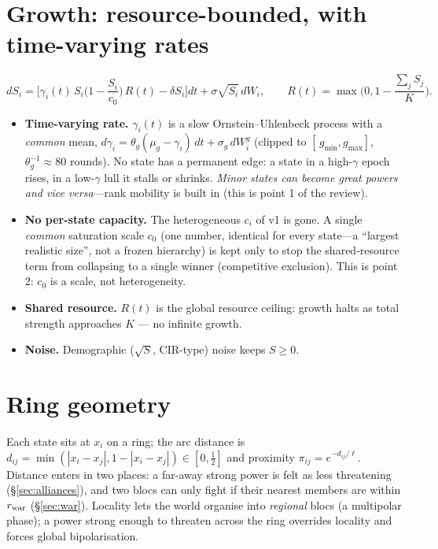 \documentclass[11pt]{article}
\begin{document}
\section{Growth: resource-bounded, with time-varying rates}\label{sec:growth}

\begin{equation}
dS_i=\Big[\gamma_i(t)\,S_i\Big(1-\frac{S_i}{c_0}\Big)\,R(t)-\delta S_i\Big]dt
      +\sigma\sqrt{S_i}\,dW_i,
\qquad R(t)=\max\!\Big(0,1-\frac{\sum_j S_j}{K}\Big).
\label{eq:growth}
\end{equation}
\begin{itemize}
\item \textbf{Time-varying rate.} $\gamma_i(t)$ is a slow Ornstein--Uhlenbeck
  process with a \emph{common} mean,
  $d\gamma_i=\theta_g(\mu_g-\gamma_i)\,dt+\sigma_g\,dW^g_i$ (clipped to
  $[\,g_{\min},g_{\max}]$, $\theta_g^{-1}\!\approx\!80$ rounds). No state has a
  permanent edge: a state in a high-$\gamma$ epoch rises, in a low-$\gamma$ lull
  it stalls or shrinks. \emph{Minor states can become great powers and vice
  versa}---rank mobility is built in (this is point 1 of the review).
\item \textbf{No per-state capacity.} The heterogeneous $c_i$ of v1 is gone. A
  single \emph{common} saturation scale $c_0$ (one number, identical for every
  state---a ``largest realistic size'', not a frozen hierarchy) is kept only to
  stop the shared-resource term from collapsing to a single winner (competitive
  exclusion). This is point 2: $c_0$ is a scale, not heterogeneity.
\item \textbf{Shared resource.} $R(t)$ is the global resource ceiling: growth
  halts as total strength approaches $K$ --- no infinite growth.
\item \textbf{Noise.} Demographic ($\sqrt{S}$, CIR-type) noise keeps $S\ge0$.
\end{itemize}

\section{Ring geometry}

Each state sits at $x_i$ on a ring; the arc distance is
$d_{ij}=\min(|x_i-x_j|,1-|x_i-x_j|)\in[0,\tfrac12]$ and proximity
$\pi_{ij}=e^{-d_{ij}/\ell}$. Distance enters in two places: a far-away strong
power is felt as less threatening (\S\ref{sec:alliances}), and two blocs can only
fight if their nearest members are within $r_{\rm war}$ (\S\ref{sec:war}).
Locality lets the world organise into \emph{regional} blocs (a multipolar phase);
a power strong enough to threaten across the ring overrides locality and forces
global bipolarisation.
\end{document}
